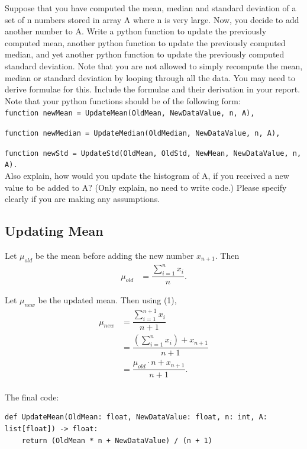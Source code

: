 \documentclass{article}
\begin{document}
\begin{tcolorbox}
    Suppose that you have computed the mean, median and standard deviation of a set of n numbers
    stored in array A where n is very large. Now, you decide to add another number to A. Write a
    python function to update the previously computed mean, another python function to update the
    previously computed median, and yet another python function to update the previously computed
    standard deviation. Note that you are not allowed to simply recompute the mean, median or
    standard deviation by looping through all the data. You may need to derive formulae for this.
    Include the formulae and their derivation in your report. Note that your python functions should
    be of the following form:
    \\[5pt]
    \texttt{function newMean = UpdateMean(OldMean, NewDataValue, n, A),}
    
    \texttt{function newMedian = UpdateMedian(OldMedian, NewDataValue, n, A),}
    
    \texttt{function newStd = UpdateStd(OldMean, OldStd, NewMean, NewDataValue, n, A).}
    \\[5pt]
    Also explain, how would you update the histogram of A, if you received a new value to be added to
    A? (Only explain, no need to write code.) Please specify clearly if you are making any assumptions.
\end{tcolorbox}

\subsection*{Updating Mean}

Let $\mu_{old}$ be the mean before adding the new number $x_{n+1}$. Then
\begin{equation}
    \begin{aligned}
        \mu_{old} &= \dfrac{\sum_{i=1}^{n}x_i}{n}.
    \end{aligned}
\end{equation} 

Let $\mu_{new}$ be the updated mean. Then using (1),
\begin{equation}
    \begin{aligned}
        \mu_{new} &= \dfrac{\sum_{i=1}^{n+1}x_i}{n+1} \\
        &= \dfrac{(\sum_{i=1}^{n}x_i) + x_{n+1}}{n+1} \\
        &= \dfrac{\mu_{old}\cdot n + x_{n+1}}{n+1}.
    \end{aligned}
\end{equation}
\\[10pt]
The final code:
\begin{lstlisting}
def UpdateMean(OldMean: float, NewDataValue: float, n: int, A: list[float]) -> float:
    return (OldMean * n + NewDataValue) / (n + 1)
\end{lstlisting}
\end{document}
